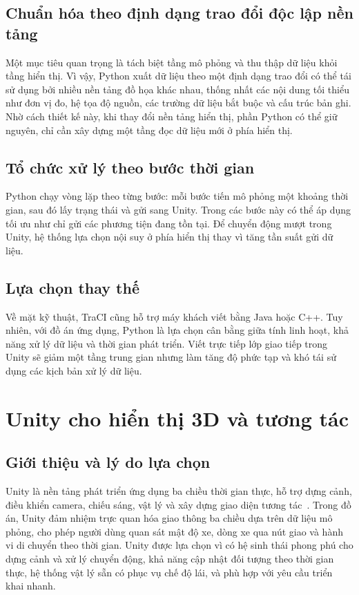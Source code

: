 ﻿\documentclass[../DoAn.tex]{subfiles}
\begin{document}
\subsection{Chuẩn hóa theo định dạng trao đổi độc lập nền tảng}

Một mục tiêu quan trọng là tách biệt tầng mô phỏng và thu thập dữ liệu khỏi tầng
hiển thị. Vì vậy, Python xuất dữ liệu theo một định dạng trao đổi có thể tái sử
dụng bởi nhiều nền tảng đồ họa khác nhau, thống nhất các nội dung tối thiểu như
đơn vị đo, hệ tọa độ nguồn, các trường dữ liệu bắt buộc và cấu trúc bản ghi. Nhờ
cách thiết kế này, khi thay đổi nền tảng hiển thị, phần Python có thể giữ nguyên,
chỉ cần xây dựng một tầng đọc dữ liệu mới ở phía hiển thị.

\subsection{Tổ chức xử lý theo bước thời gian}

Python chạy vòng lặp theo từng bước: mỗi bước tiến mô phỏng một khoảng thời gian,
sau đó lấy trạng thái và gửi sang Unity. Trong các bước này có thể áp dụng tối ưu
như chỉ gửi các phương tiện đang tồn tại. Để chuyển động mượt trong Unity, hệ
thống lựa chọn nội suy ở phía hiển thị thay vì tăng tần suất gửi dữ liệu.

\subsection{Lựa chọn thay thế}

Về mặt kỹ thuật, \gls{TraCI} cũng hỗ trợ máy khách viết bằng Java hoặc C++. Tuy
nhiên, với đồ án ứng dụng, Python là lựa chọn cân bằng giữa tính linh hoạt, khả
năng xử lý dữ liệu và thời gian phát triển. Viết trực tiếp lớp giao tiếp trong
Unity sẽ giảm một tầng trung gian nhưng làm tăng độ phức tạp và khó tái sử dụng
các kịch bản xử lý dữ liệu.

\section{Unity cho hiển thị 3D và tương tác}

\subsection{Giới thiệu và lý do lựa chọn}

Unity là nền tảng phát triển ứng dụng ba chiều thời gian thực, hỗ trợ dựng cảnh,
điều khiển camera, chiếu sáng, vật lý và xây dựng giao diện tương tác~\cite{unity_manual}. Trong đồ
án, Unity đảm nhiệm trực quan hóa giao thông ba chiều dựa trên dữ liệu mô phỏng,
cho phép người dùng quan sát mật độ xe, dòng xe qua nút giao và hành vi di chuyển
theo thời gian. Unity được lựa chọn vì có hệ sinh thái phong phú cho dựng cảnh và
xử lý chuyển động, khả năng cập nhật đối tượng theo thời gian thực, hệ thống vật
lý sẵn có phục vụ chế độ lái, và phù hợp với yêu cầu triển khai nhanh.
\end{document}
